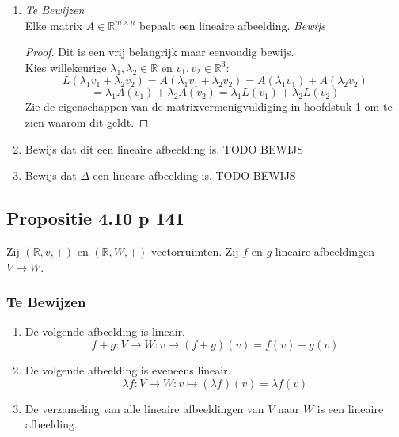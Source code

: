 \documentclass[lineaire_algebra_oplossingen.tex]{subfiles}
\begin{document}
\begin{enumerate}
\item 
\emph{Te Bewijzen}\\
Elke matrix $A \in \mathbb{R}^{m\times n}$ bepaalt een lineaire afbeelding.
\emph{Bewijs}\\
\begin{proof}
Dit is een vrij belangrijk maar eenvoudig bewijs.\\
Kies willekeurige $\lambda_1, \lambda_2 \in \mathbb{R}$ en $v_1,v_2 \in \mathbb{R}^3$:
\[
L(\lambda_1v_1+\lambda_2v_2) = A(\lambda_1v_1+\lambda_2v_2) = A(\lambda_1v_1)+A(\lambda_2v_2)
\]
\[
 = \lambda_1A(v_1)+\lambda_2A(v_2) =\lambda_1 L(v_1)+\lambda_2L(v_2)
\]
Zie de eigenschappen van de matrixvermenigvuldiging in hoofdstuk 1 om te zien waarom dit geldt.
\end{proof}

\item Bewijs dat dit een lineaire afbeelding is.
TODO BEWIJS
\item Bewijs dat $\Delta$ een lineare afbeelding is.
TODO BEWIJS
\end{enumerate}
\subsection{Propositie 4.10 p 141}
Zij $(\mathbb{R},v,+)$ en $(\mathbb{R},W,+)$ vectorruimten. Zij $f$ en $g$ lineaire afbeeldingen $V\rightarrow W$.
\subsubsection*{Te Bewijzen}
\begin{enumerate}
\item De volgende afbeelding is lineair.
\[f+g: V \rightarrow W: v\mapsto(f+g)(v)=f(v)+g(v)\]
\item De volgende afbeelding is eveneens lineair.
\[\lambda f: V\rightarrow W: v\mapsto (\lambda f)(v) = \lambda f(v)\]
\item De verzameling van alle lineaire afbeeldingen van $V$ naar $W$ is een lineaire afbeelding.
\end{enumerate}
\end{document}
